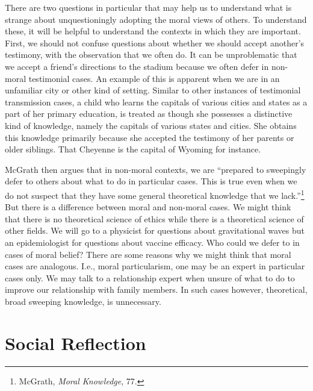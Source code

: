 \documentclass[phdthesis,12pt,final]{wuthesis}
\theoremstyle{definition}
\theoremstyle{definition}
\theoremstyle{definition}
\theoremstyle{definition}
\theoremstyle{remark}
\begin{document}
There are two questions in particular that may help us to understand what is strange about unquestioningly adopting the moral views of others. To understand these, it will be helpful to understand the contexts in which they are important. First, we should not confuse questions about whether we should accept another's testimony, with the observation that we often do. It can be unproblematic that we accept a friend's directions to the stadium because we often defer in non-moral testimonial cases. An example of this is apparent when we are in an unfamiliar city or other kind of setting. Similar to other instances of testimonial transmission cases, a child who learns the capitals of various cities and states as a part of her primary education, is treated as though she possesses a distinctive kind of knowledge, namely the capitals of various states and cities. She obtains this knowledge primarily because she accepted the testimony of her parents or older siblings. That Cheyenne is the capital of Wyoming for instance.

McGrath then argues that in non-moral contexts, we are ``prepared to sweepingly defer to others about what to do in particular cases. This is true even when we do not suspect that they have some general theoretical knowledge that we lack.''\footnote{McGrath, \emph{Moral {Knowledge}}, 77.} But there is a difference between moral and non-moral cases. We might think that there is no theoretical science of ethics while there is a theoretical science of other fields. We will go to a physicist for questions about gravitational waves but an epidemiologist for questions about vaccine efficacy. Who could we defer to in cases of moral belief? There are some reasons why we might think that moral cases are analogous. I.e., moral particularism, one may be an expert in particular cases only. We may talk to a relationship expert when unsure of what to do to improve our relationship with family members. In such cases however, theoretical, broad sweeping knowledge, is unnecessary.

\section{Social Reflection}\label{social-reflection}
\end{document}
